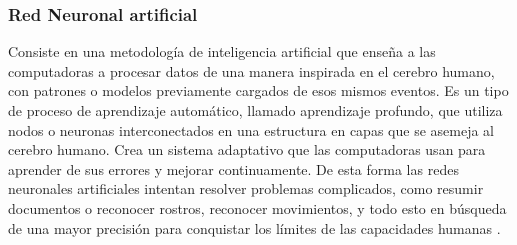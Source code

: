 \subsubsection{Red Neuronal artificial}

Consiste en una metodología de inteligencia artificial que enseña a las computadoras a procesar datos de una manera inspirada en el cerebro humano, con patrones o modelos previamente cargados de esos mismos eventos. Es un tipo de proceso de aprendizaje automático, llamado aprendizaje profundo, que utiliza nodos o neuronas interconectados en una estructura en capas que se asemeja al cerebro humano. Crea un sistema adaptativo que las computadoras usan para aprender de sus errores y mejorar continuamente. De esta forma las redes neuronales artificiales intentan resolver problemas complicados, como resumir documentos o reconocer rostros, reconocer movimientos, y todo esto en búsqueda de una mayor precisión para conquistar los límites de las capacidades humanas \cite{ANN}.





